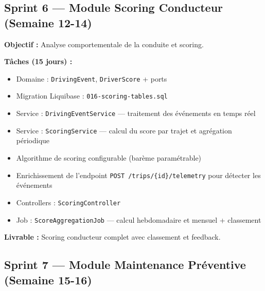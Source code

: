 \documentclass[12pt,a4paper]{report}
\begin{document}
\subsection{Sprint 6 — Module Scoring Conducteur (Semaine 12-14)}

\begin{tcolorbox}[colback=fleetpurple!5, colframe=fleetpurple, title={\bfseries Sprint 6 — Scoring et Éco-conduite}]
\textbf{Objectif :} Analyse comportementale de la conduite et scoring.

\textbf{Tâches (15 jours) :}
\begin{itemize}[leftmargin=1.5cm]
  \item Domaine : \texttt{DrivingEvent}, \texttt{DriverScore} + ports
  \item Migration Liquibase : \texttt{016-scoring-tables.sql}
  \item Service : \texttt{DrivingEventService} — traitement des événements en temps réel
  \item Service : \texttt{ScoringService} — calcul du score par trajet et agrégation périodique
  \item Algorithme de scoring configurable (barème paramétrable)
  \item Enrichissement de l'endpoint \texttt{POST /trips/\{id\}/telemetry} pour détecter les événements
  \item Controllers : \texttt{ScoringController}
  \item Job : \texttt{ScoreAggregationJob} — calcul hebdomadaire et mensuel + classement
\end{itemize}

\textbf{Livrable :} Scoring conducteur complet avec classement et feedback.
\end{tcolorbox}

\subsection{Sprint 7 — Module Maintenance Préventive (Semaine 15-16)}
\end{document}
